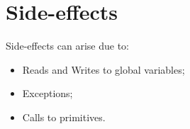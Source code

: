 \documentclass{book}
\begin{document}
\chapter{Side-effects}

Side-effects can arise due to:
\begin{itemize}
\item Reads and Writes to global variables;
\item Exceptions;
\item Calls to primitives.
\end{itemize}



\end{document}
